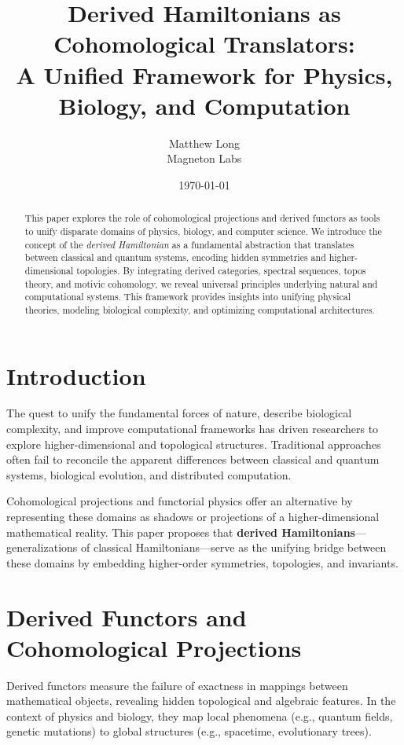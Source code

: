\documentclass{article}
\title{\textbf{Derived Hamiltonians as Cohomological Translators:}\\
\large{A Unified Framework for Physics, Biology, and Computation}}
\author{Matthew Long \\ Magneton Labs}
\date{\today}
\begin{document}
\maketitle

\begin{abstract}
This paper explores the role of cohomological projections and derived functors as tools to unify disparate domains of physics, biology, and computer science. We introduce the concept of the \textit{derived Hamiltonian} as a fundamental abstraction that translates between classical and quantum systems, encoding hidden symmetries and higher-dimensional topologies. By integrating derived categories, spectral sequences, topos theory, and motivic cohomology, we reveal universal principles underlying natural and computational systems. This framework provides insights into unifying physical theories, modeling biological complexity, and optimizing computational architectures.
\end{abstract}

\section{Introduction}
The quest to unify the fundamental forces of nature, describe biological complexity, and improve computational frameworks has driven researchers to explore higher-dimensional and topological structures. Traditional approaches often fail to reconcile the apparent differences between classical and quantum systems, biological evolution, and distributed computation.

Cohomological projections and functorial physics offer an alternative by representing these domains as shadows or projections of a higher-dimensional mathematical reality. This paper proposes that \textbf{derived Hamiltonians}—generalizations of classical Hamiltonians—serve as the unifying bridge between these domains by embedding higher-order symmetries, topologies, and invariants.

\section{Derived Functors and Cohomological Projections}
Derived functors measure the failure of exactness in mappings between mathematical objects, revealing hidden topological and algebraic features. In the context of physics and biology, they map local phenomena (e.g., quantum fields, genetic mutations) to global structures (e.g., spacetime, evolutionary trees).
\end{document}
